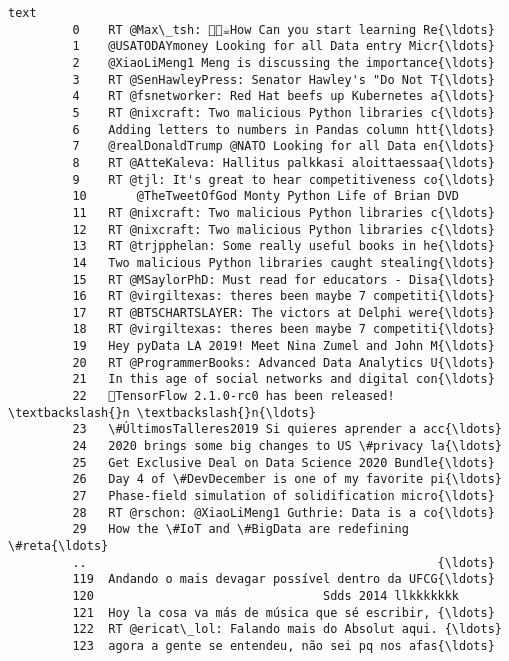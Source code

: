 \documentclass[11pt]{article}
\begin{document}
\begin{Verbatim}[commandchars=\\\{\}]
                                                           text  
         0    RT @Max\_tsh: 👨‍💻☕How Can you start learning Re{\ldots}  
         1    @USATODAYmoney Looking for all Data entry Micr{\ldots}  
         2    @XiaoLiMeng1 Meng is discussing the importance{\ldots}  
         3    RT @SenHawleyPress: Senator Hawley's "Do Not T{\ldots}  
         4    RT @fsnetworker: Red Hat beefs up Kubernetes a{\ldots}  
         5    RT @nixcraft: Two malicious Python libraries c{\ldots}  
         6    Adding letters to numbers in Pandas column htt{\ldots}  
         7    @realDonaldTrump @NATO Looking for all Data en{\ldots}  
         8    RT @AtteKaleva: Hallitus palkkasi aloittaessaa{\ldots}  
         9    RT @tjl: It's great to hear competitiveness co{\ldots}  
         10       @TheTweetOfGod Monty Python Life of Brian DVD  
         11   RT @nixcraft: Two malicious Python libraries c{\ldots}  
         12   RT @nixcraft: Two malicious Python libraries c{\ldots}  
         13   RT @trjpphelan: Some really useful books in he{\ldots}  
         14   Two malicious Python libraries caught stealing{\ldots}  
         15   RT @MSaylorPhD: Must read for educators - Disa{\ldots}  
         16   RT @virgiltexas: theres been maybe 7 competiti{\ldots}  
         17   RT @BTSCHARTSLAYER: The victors at Delphi were{\ldots}  
         18   RT @virgiltexas: theres been maybe 7 competiti{\ldots}  
         19   Hey pyData LA 2019! Meet Nina Zumel and John M{\ldots}  
         20   RT @ProgrammerBooks: Advanced Data Analytics U{\ldots}  
         21   In this age of social networks and digital con{\ldots}  
         22   🎉TensorFlow 2.1.0-rc0 has been released! \textbackslash{}n \textbackslash{}n{\ldots}  
         23   \#ÚltimosTalleres2019 Si quieres aprender a acc{\ldots}  
         24   2020 brings some big changes to US \#privacy la{\ldots}  
         25   Get Exclusive Deal on Data Science 2020 Bundle{\ldots}  
         26   Day 4 of \#DevDecember is one of my favorite pi{\ldots}  
         27   Phase-field simulation of solidification micro{\ldots}  
         28   RT @rschon: @XiaoLiMeng1 Guthrie: Data is a co{\ldots}  
         29   How the \#IoT and \#BigData are redefining \#reta{\ldots}  
         ..                                                 {\ldots}  
         119  Andando o mais devagar possível dentro da UFCG{\ldots}  
         120                                Sdds 2014 llkkkkkkk  
         121  Hoy la cosa va más de música que sé escribir, {\ldots}  
         122  RT @ericat\_lol: Falando mais do Absolut aqui. {\ldots}  
         123  agora a gente se entendeu, não sei pq nos afas{\ldots}  

\end{Verbatim}
\end{document}
